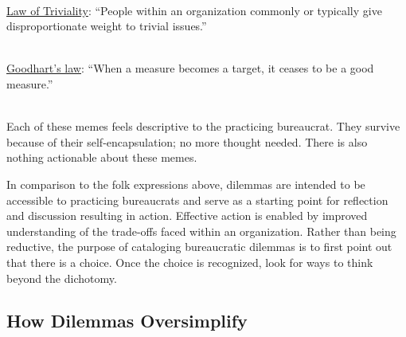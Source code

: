 \ \\
\href{https://en.wikipedia.org/wiki/Law_of_triviality}{Law of Triviality}:%
%
%
``People within an organization commonly or typically give disproportionate weight to trivial issues.''

\ \\
\href{https://en.wikipedia.org/wiki/Goodhart\%27s_law}{Goodhart's law}:
%
%
%
``When a measure becomes a target, it ceases to be a good measure.''

\ \\

Each of these memes feels descriptive to the practicing bureaucrat. They survive because of their self-encapsulation; no more thought needed. There is also nothing actionable about these memes.

In comparison to the folk expressions above, dilemmas are intended to be accessible to practicing bureaucrats and serve as a starting point for reflection and discussion resulting in action. Effective action is enabled by improved understanding of the trade-offs faced within an organization. Rather than being reductive, the purpose of cataloging bureaucratic dilemmas is to first point out that there is a choice. Once the choice is recognized, look for ways to think beyond the dichotomy.

\subsection*{How Dilemmas Oversimplify}


